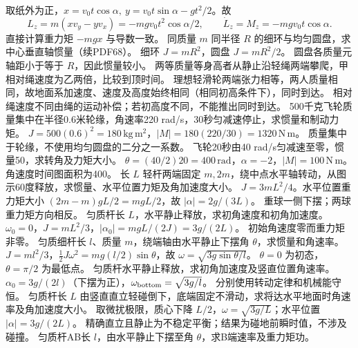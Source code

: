 \workings 取纸外为正，$x=v_0t\cos\alpha,\ y=v_0t\sin\alpha-gt^2/2$。故
\[
L_z=m(xv_y-yv_x)=-mgv_0t^2\cos\alpha/2,\qquad
\dot L_z=M_z=-mgv_0t\cos\alpha.
\]
\crosscheck 直接计算重力矩 $-mgx$ 与导数一致。
\problemtext 同质量 $m$ 同半径 $R$ 的细环与均匀圆盘，求中心垂直轴惯量（续PDF68）。
\workings 细环 $J=mR^2$，圆盘 $J=mR^2/2$。
\crosscheck 圆盘各质量元轴距小于等于 $R$，因此惯量较小。
\problemtext 两等质量等身高者从静止沿轻绳两端攀爬，甲相对绳速度为乙两倍，比较到顶时间。
\workings 理想轻滑轮两端张力相等，两人质量相同，故地面系加速度、速度及高度始终相同（相同初高条件下），同时到达。
\crosscheck 相对绳速度不同由绳的运动补偿；若初高度不同，不能推出同时到达。
\problemtext 500千克飞轮质量集中在半径0.6米轮缘，角速率220 rad/s，30秒匀减速停止，求惯量和制动力矩。
\workings $J=500(0.6)^2=180\,\mathrm{kg\,m^2}$，$|M|=180(220/30)=1320\,\mathrm{N\,m}$。
\crosscheck 质量集中于轮缘，不使用均匀圆盘的二分之一系数。
\problemtext 飞轮20秒由40 rad/s匀减速至零，惯量50，求转角及力矩大小。
\workings $\theta=(40/2)20=400\,\mathrm{rad}$，$\alpha=-2$，$|M|=100\,\mathrm{N\,m}$。
\crosscheck 角速度时间图面积为400。
\problemtext 长 $L$ 轻杆两端固定 $m,2m$，绕中点水平轴转动，从图示60度释放，求惯量、水平位置力矩及角加速度大小。
\workings $J=3mL^2/4$。水平位置重力矩大小 $(2m-m)gL/2=mgL/2$，故 $|\alpha|=2g/(3L)$。
\crosscheck 重球一侧下摆；两球重力矩方向相反。
\problemtext 匀质杆长 $L$，水平静止释放，求初角速度和初角加速度。
\workings $\omega_0=0$，$J=mL^2/3$，$|\alpha_0|=mgL/(2J)=3g/(2L)$。
\crosscheck 初始角速度零而重力矩非零。
\problemtext 匀质细杆长 $l$、质量 $m$，绕端轴由水平静止下摆角 $\theta$，求惯量和角速率。
\workings $J=ml^2/3$，$\frac12J\omega^2=mg(l/2)\sin\theta$，故 $\omega=\sqrt{3g\sin\theta/l}$。
\crosscheck $\theta=0$ 为初态，$\theta=\pi/2$ 为最低点。
\problemtext 匀质杆水平静止释放，求初角加速度及竖直位置角速率。
\workings $\alpha_0=3g/(2l)$（下摆为正），$\omega_{\rm bottom}=\sqrt{3g/l}$。
\crosscheck 分别使用转动定律和机械能守恒。
\problemtext 匀质杆长 $L$ 由竖直直立轻碰倒下，底端固定不滑动，求将达水平地面时角速率及角加速度大小。
\workings 取微扰极限，质心下降 $L/2$，$\omega=\sqrt{3g/L}$；水平位置 $|\alpha|=3g/(2L)$。
\crosscheck 精确直立且静止为不稳定平衡；结果为碰地前瞬时值，不涉及碰撞。
\problemtext 匀质杆AB长 $l$，由水平静止下摆至角 $\theta$，求B端速率及重力矩功。
